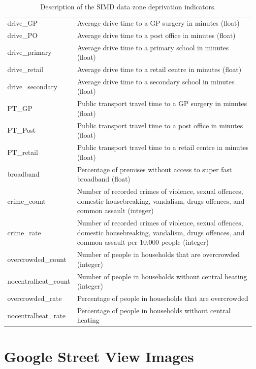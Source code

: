 \documentclass{thesis}
\begin{document}
\begin{table}[ht!]
\begin{tabular}{||l p{100mm}||}
     drive\_GP & Average drive time to a GP surgery in minutes (float) \\
     drive\_PO & Average drive time to a post office in minutes (float) \\
     drive\_primary & Average drive time to a primary school in minutes (float) \\
     drive\_retail & Average drive time to a retail centre in minutes (float) \\
     drive\_secondary & Average drive time to a secondary school in minutes (float) \\
     PT\_GP & Public transport travel time to a GP surgery in minutes (float) \\
     PT\_Post & Public transport travel time to a post office in minutes (float) \\
     PT\_retail & Public transport travel time to a retail centre in minutes (float) \\
     broadband & Percentage of premises without access to super fast broadband (float) \\
     crime\_count & Number of recorded crimes of violence, sexual offences, domestic housebreaking, vandalism, \newline drugs offences, and common assault (integer) \\
     crime\_rate & Number of recorded crimes of violence, sexual offences, domestic housebreaking, vandalism, \newline drugs offences, and common assault per 10,000 people (integer) \\
     overcrowded\_count & Number of people in households that are overcrowded (integer) \\
     nocentralheat\_count & Number of people in households without central heating (integer) \\
     overcrowded\_rate & Percentage of people in households that are overcrowded \\
     nocentralheat\_rate & Percentage of people in households without central heating \\ [1ex] 
     \hline
    \end{tabular}
    \caption{Description of the SIMD data zone deprivation indicators.}
    \label{table:simd-deprivation-indicators}
\end{table}


\section{Google Street View Images}
\end{document}
